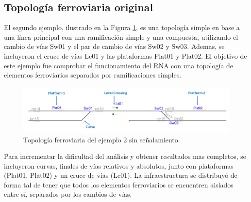 \subsection{Topología ferroviaria original}

	El segundo ejemplo, ilustrado en la Figura \ref{fig:EJ2_1}, es una topología simple en base a una línea principal con una ramificación simple y una compuesta, utilizando el cambio de vías Sw01 y el par de cambio de vías Sw02 y Sw03. Ademas, se incluyeron el cruce de vías Lc01 y las plataformas Plat01 y Plat02. El objetivo de este ejemplo fue comprobar el funcionamiento del RNA con una topología de elementos ferroviarios separados por ramificaciones simples.
	
	\begin{figure}[H]
		\centering
		\includegraphics[width=1\textwidth]{resultados-obtenidos/ejemplo2/images/2_empty.png}
		\centering\caption{Topología ferroviaria del ejemplo 2 sin señalamiento.}
		\label{fig:EJ2_1}
	\end{figure}
	
	Para incrementar la dificultad del análisis y obtener resultados mas completos, se incluyeron curvas, finales de vías relativos y absolutos, junto con plataformas (Plat01, Plat02) y un cruce de vías (Lc01). La infraestructura se distribuyó de forma tal de tener que todos los elementos ferroviarios se encuentren aislados entre sí, separados por los cambios de vías.